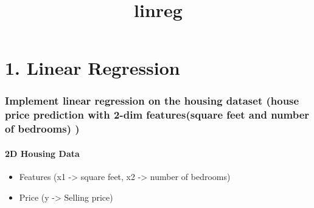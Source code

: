 \documentclass[11pt]{article}
\title{linreg}
\providecommand{\tightlist}{%
      \setlength{\itemsep}{0pt}\setlength{\parskip}{0pt}}
\begin{document}
    
    
    \maketitle
    
    

    
    \section{1. Linear Regression}\label{linear-regression}

\subsubsection{Implement linear regression on the housing dataset (house
price prediction with 2-dim features(square feet and number of bedrooms)
)}\label{implement-linear-regression-on-the-housing-dataset-house-price-prediction-with-2-dim-featuressquare-feet-and-number-of-bedrooms}

\paragraph{2D Housing Data}\label{d-housing-data}

\begin{itemize}
\tightlist
\item
  Features (x1 -\textgreater{} square feet, x2 -\textgreater{} number of
  bedrooms)
\item
  Price (y -\textgreater{} Selling price)
\end{itemize}
\end{document}
